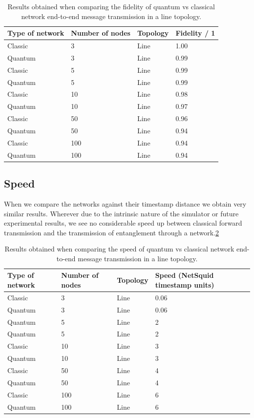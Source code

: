 \documentclass{article}
\begin{document}
    \begin{table}[!h] 
    \caption{Results obtained when comparing the fidelity of quantum vs classical network end-to-end message transmission in a line topology.}
    \label{table_fidelity} 
    \centering 
    \begin{tabular}{|l || l|  l| l|} 
    \hline 
    Type of network & Number of nodes & Topology & Fidelity / 1 \\
    \hline 
    Classic & 3 & Line & 1.00\\ 
    Quantum & 3 & Line & 0.99\\ 
    Classic & 5 & Line & 0.99\\ 
    Quantum & 5 & Line & 0.99\\ 
    Classic & 10 & Line & 0.98\\ 
    Quantum & 10 & Line & 0.97\\ 
    Classic & 50 & Line & 0.96\\ 
    Quantum & 50 & Line & 0.94\\    
    Classic & 100 & Line & 0.94\\ 
    Quantum & 100 & Line & 0.94\\
    \hline 
    \end{tabular} 
    \end{table} 
    
    \subsection*{Speed}
    When we compare the networks against their timestamp distance we obtain very similar results. Wherever due to the intrinsic nature of the simulator or future experimental results, we see no considerable speed up between classical forward transmission and the transmission of entanglement through a network.\ref{table_speed} 
    
    \begin{table}[!h] 
    \caption{Results obtained when comparing the speed of quantum vs classical network end-to-end message transmission in a line topology.}
    \label{table_speed} 
    \centering 
    \begin{tabular}{|l || l|  l| l|}  
    \hline 
    Type of network & Number of nodes & Topology & Speed (NetSquid timestamp units)  \\
    \hline 
    Classic & 3 & Line & 0.06\\ 
    Quantum & 3 & Line & 0.06 \\
    Quantum & 5 & Line & 2\\ 
    Quantum & 5 & Line & 2\\ 
    Classic & 10 & Line & 3\\ 
    Quantum & 10 & Line & 3\\ 
    Classic & 50 & Line & 4\\ 
    Quantum & 50 & Line & 4\\    
    Classic & 100 & Line & 6\\ 
    Quantum & 100 & Line & 6\\
    \hline 
    \end{tabular} 
    \end{table} 
\end{document}
